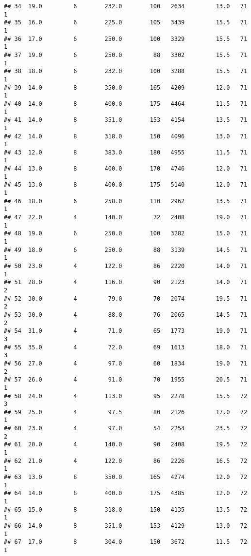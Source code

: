 \documentclass[
]{article}
\begin{document}
\begin{verbatim}
## 34  19.0         6        232.0        100   2634         13.0   71      1
## 35  16.0         6        225.0        105   3439         15.5   71      1
## 36  17.0         6        250.0        100   3329         15.5   71      1
## 37  19.0         6        250.0         88   3302         15.5   71      1
## 38  18.0         6        232.0        100   3288         15.5   71      1
## 39  14.0         8        350.0        165   4209         12.0   71      1
## 40  14.0         8        400.0        175   4464         11.5   71      1
## 41  14.0         8        351.0        153   4154         13.5   71      1
## 42  14.0         8        318.0        150   4096         13.0   71      1
## 43  12.0         8        383.0        180   4955         11.5   71      1
## 44  13.0         8        400.0        170   4746         12.0   71      1
## 45  13.0         8        400.0        175   5140         12.0   71      1
## 46  18.0         6        258.0        110   2962         13.5   71      1
## 47  22.0         4        140.0         72   2408         19.0   71      1
## 48  19.0         6        250.0        100   3282         15.0   71      1
## 49  18.0         6        250.0         88   3139         14.5   71      1
## 50  23.0         4        122.0         86   2220         14.0   71      1
## 51  28.0         4        116.0         90   2123         14.0   71      2
## 52  30.0         4         79.0         70   2074         19.5   71      2
## 53  30.0         4         88.0         76   2065         14.5   71      2
## 54  31.0         4         71.0         65   1773         19.0   71      3
## 55  35.0         4         72.0         69   1613         18.0   71      3
## 56  27.0         4         97.0         60   1834         19.0   71      2
## 57  26.0         4         91.0         70   1955         20.5   71      1
## 58  24.0         4        113.0         95   2278         15.5   72      3
## 59  25.0         4         97.5         80   2126         17.0   72      1
## 60  23.0         4         97.0         54   2254         23.5   72      2
## 61  20.0         4        140.0         90   2408         19.5   72      1
## 62  21.0         4        122.0         86   2226         16.5   72      1
## 63  13.0         8        350.0        165   4274         12.0   72      1
## 64  14.0         8        400.0        175   4385         12.0   72      1
## 65  15.0         8        318.0        150   4135         13.5   72      1
## 66  14.0         8        351.0        153   4129         13.0   72      1
## 67  17.0         8        304.0        150   3672         11.5   72      1

\end{verbatim}
\end{document}
